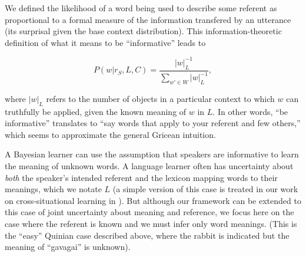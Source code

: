 \documentclass[review]{elsarticle}
\begin{document}
We defined the likelihood of a word being used to describe some referent as proportional to a formal measure of the information transfered by an utterance (its surprisal given the base context distribution). This information-theoretic definition of what it means to be ``informative'' leads to

\begin{equation}
\label{eq:likelihood}
P(w | r_S, L, C) = \frac{|w|_L^{-1}}{\displaystyle \sum_{w' \in W} |w|_L^{-1}},
\end{equation}

\noindent where $|w|_L$ refers to the number of objects in a particular context to which $w$ can truthfully be applied, given the known meaning of $w$ in $L$. In other words, ``be informative'' translates to ``say words that apply to your referent and few others,'' which seems to approximate the general Gricean intuition.


A Bayesian learner can use the assumption that speakers are informative to learn the meaning of unknown words. A language learner often has uncertainty about \emph{both} the speaker's intended referent and the lexicon mapping words to their meanings, which we notate $L$ (a simple version of this case is treated in our work on cross-situational learning in \citealp{frank2009}). But although our framework can be extended to this case of joint uncertainty about meaning and reference, we focus here on the case where the referent is known and we must infer only word meanings. (This is the ``easy'' Quinian case described above, where the rabbit is indicated but the meaning of ``gavagai'' is unknown).
\end{document}
